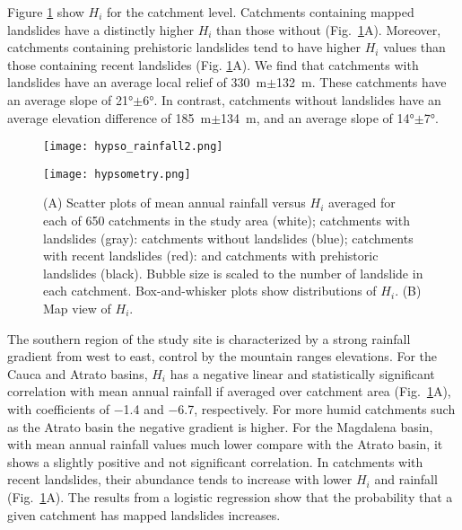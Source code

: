 \documentclass[draft]{agujournal2019}
\begin{document}
\par Figure \ref{fig:hypso} show $H_i$ for the catchment level. Catchments containing mapped landslides have a distinctly higher $H_i$ than those without (Fig.~\ref{fig:hypso}A). Moreover, catchments containing prehistoric landslides tend to have higher $H_i$ values than those containing recent landslides (Fig. \ref{fig:hypso}A). We find that catchments with landslides have an average local relief of 330~m$\pm$132~m. These catchments have an average slope of 21°$\pm$6°. In contrast, catchments without landslides have an average elevation difference of 185~m$\pm$134~m, and an average slope of 14°$\pm$7°.

\begin{figure}[ht!]
  \begin{minipage}{.48\linewidth}
    \centering
    {\texttt{[image: hypso\_rainfall2.png]}}
   \end{minipage}\quad
   \begin{minipage}{.48\linewidth}
    \centering
      {\texttt{[image: hypsometry.png]}}
  \end{minipage}
    \caption{(A) Scatter plots of mean annual rainfall versus $H_i$ averaged for each of 650 catchments in the study area (white); catchments with landslides (gray): catchments without landslides (blue); catchments with recent landslides (red): and catchments with prehistoric landslides (black). Bubble size is scaled to the number of landslide in each catchment. Box-and-whisker plots show distributions of $H_i$. (B) Map view of $H_i$.}
    \label{fig:hypso}
\end{figure}

\par The southern region of the study site is characterized by a strong rainfall gradient from west to east, control by the mountain ranges elevations. For the Cauca and Atrato basins, $H_i$ has a negative linear and statistically significant correlation with mean annual rainfall if averaged over catchment area (Fig.~\ref{fig:hypso}A), with coefficients of $-$1.4 and $-$6.7, respectively. For more humid catchments such as the Atrato basin the negative gradient is higher. For the Magdalena basin, with mean annual rainfall values much lower compare with the Atrato basin, it shows a slightly positive and not significant correlation. In catchments with recent landslides, their abundance tends to increase with lower $H_i$ and rainfall (Fig.~\ref{fig:hypso}A). The results from a logistic regression show that the probability that a given catchment has mapped landslides increases.
\end{document}
